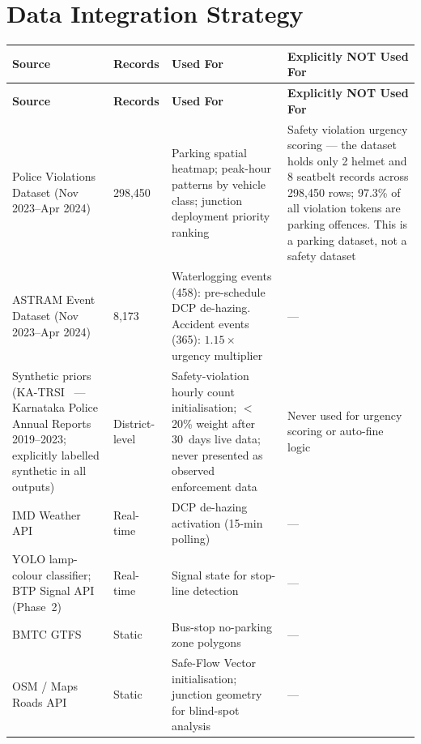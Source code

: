 \documentclass[11pt,a4paper]{article}
\begin{document}
\section{Data Integration Strategy}
\begin{longtable}{L{3cm} C{1.8cm} L{4.5cm} L{5cm}}
    \toprule
    \color{white}\textbf{Source} & \color{white}\textbf{Records} & \color{white}\textbf{Used For} & \color{white}\textbf{Explicitly NOT Used For} \\
    \midrule
    \endfirsthead
    \toprule
    \color{white}\textbf{Source} & \color{white}\textbf{Records} & \color{white}\textbf{Used For} & \color{white}\textbf{Explicitly NOT Used For} \\
    \midrule
    \endhead
    \bottomrule
    \endfoot

    Police Violations Dataset (Nov 2023--Apr 2024) & 298,450 & Parking spatial heatmap; peak-hour patterns by vehicle class; junction deployment priority ranking & Safety violation urgency scoring --- the dataset holds only 2 helmet and 8 seatbelt records across 298,450 rows; 97.3\% of all violation tokens are parking offences. This is a parking dataset, not a safety dataset \\
    ASTRAM Event Dataset (Nov 2023--Apr 2024) & 8,173 & Waterlogging events (458): pre-schedule DCP de-hazing. Accident events (365): $1.15\times$ urgency multiplier & --- \\
    Synthetic priors (KA-TRSI~\cite{katrsi2023} — Karnataka Police Annual Reports 2019--2023; explicitly labelled synthetic in all outputs) & District-level & Safety-violation hourly count initialisation; $<$20\% weight after 30~days live data; never presented as observed enforcement data & Never used for urgency scoring or auto-fine logic \\
    IMD Weather API & Real-time & DCP de-hazing activation (15-min polling) & --- \\
    YOLO lamp-colour classifier; BTP Signal API (Phase~2) & Real-time & Signal state for stop-line detection & --- \\
    BMTC GTFS & Static & Bus-stop no-parking zone polygons & --- \\
    OSM / Maps Roads API & Static & Safe-Flow Vector initialisation; junction geometry for blind-spot analysis & --- \\
\end{longtable}
\end{document}
